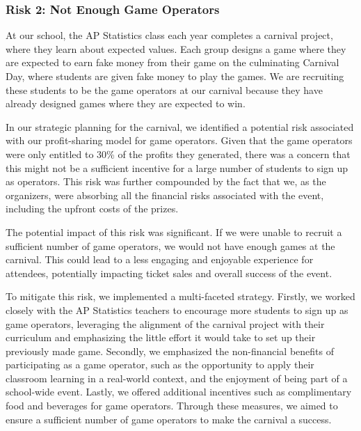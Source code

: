 \subsubsection{Risk 2: Not Enough Game Operators}

At our school, the AP Statistics class each year completes a carnival project, where they learn about expected values. Each group designs a game where they are expected to earn fake money from their game on the culminating Carnival Day, where students are given fake money to play the games. We are recruiting these students to be the game operators at our carnival because they have already designed games where they are expected to win.

In our strategic planning for the carnival, we identified a potential risk associated with our profit-sharing model for game operators. Given that the game operators were only entitled to 30\% of the profits they generated, there was a concern that this might not be a sufficient incentive for a large number of students to sign up as operators. This risk was further compounded by the fact that we, as the organizers, were absorbing all the financial risks associated with the event, including the upfront costs of the prizes.

The potential impact of this risk was significant. If we were unable to recruit a sufficient number of game operators, we would not have enough games at the carnival. This could lead to a less engaging and enjoyable experience for attendees, potentially impacting ticket sales and overall success of the event.

To mitigate this risk, we implemented a multi-faceted strategy. Firstly, we worked closely with the AP Statistics teachers to encourage more students to sign up as game operators, leveraging the alignment of the carnival project with their curriculum and emphasizing the little effort it would take to set up their previously made game. Secondly, we emphasized the non-financial benefits of participating as a game operator, such as the opportunity to apply their classroom learning in a real-world context, and the enjoyment of being part of a school-wide event. Lastly, we offered additional incentives such as complimentary food and beverages for game operators. Through these measures, we aimed to ensure a sufficient number of game operators to make the carnival a success.
